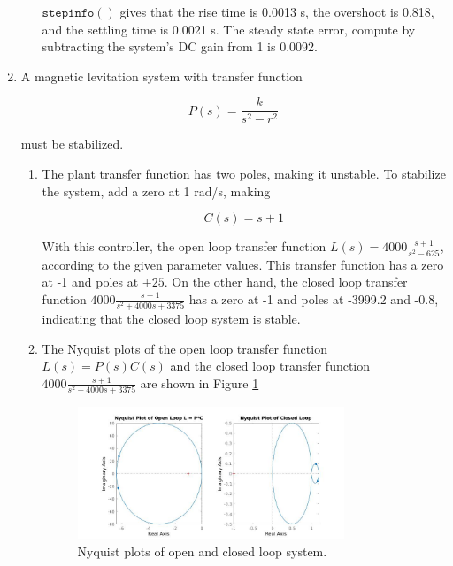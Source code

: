 \documentclass[11pt]{article}
\theoremstyle{definition}
\begin{document}
\begin{enumerate}
\begin{enumerate}
        $\mathtt{stepinfo()}$ gives that the rise time is 0.0013 s, the overshoot is 0.818, and the settling time is 0.0021 s.  The steady state error, compute by subtracting the system's DC gain from 1 is 0.0092.


    \end{enumerate}

    \item %
    A magnetic levitation system with transfer function 

    $$ P(s) = \frac{k}{s^2 - r^2} $$

    must be stabilized.

    \begin{enumerate}
        \item %
        The plant transfer function has two poles, making it unstable.  To stabilize the system, add a zero at 1 rad/s, making

        $$ C(s) = s + 1 $$

        With this controller, the open loop transfer function $L(s) = 4000 \frac{s + 1}{s^2 - 625}$, according to the given parameter values.  This transfer function has a zero at -1 and poles at $\pm 25$.
        On the other hand, the closed loop transfer function $4000\frac{s + 1}{s^2 + 4000s + 3375}$ has a zero at -1 and poles at -3999.2 and -0.8, indicating that the closed loop system is stable.  

        \item %
        The Nyquist plots of the open loop transfer function $L(s) = P(s)C(s)$ and the closed loop transfer function $4000\frac{s + 1}{s^2 + 4000s + 3375}$ are shown in Figure \ref{fig:3b}

        \begin{figure}[H]
            \centering
            \includegraphics[width = 0.8\textwidth]{ES155P8_3b.jpg}
            \caption{Nyquist plots of open and closed loop system.}
            \label{fig:3b}
        \end{figure}


\end{enumerate}
\end{enumerate}
\end{document}
